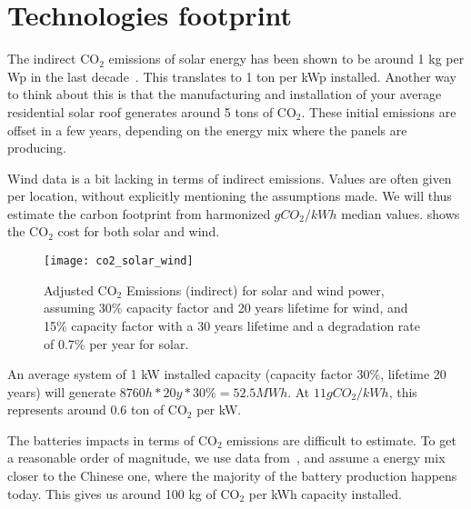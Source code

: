 \section{Technologies footprint}

The indirect $\mathrm{CO_2}$ emissions of solar energy has been shown to be around 1 kg per Wp in the last decade~. This translates to 1 ton per kWp installed. Another way to think about this is that the manufacturing and installation of your average residential solar roof generates around 5 tons of $\mathrm{CO_2}$. These initial emissions are offset in a few years, depending on the energy mix where the panels are producing.

Wind data is a bit lacking in terms of indirect emissions. Values are often given per location, without explicitly mentioning the assumptions made. We will thus estimate the carbon footprint from harmonized $gCO_2/kWh$ median values.  shows the $\mathrm{CO_2}$ cost for both solar and wind.


\begin{figure}[h]
	\texttt{[image: co2\_solar\_wind]}
	\caption[Adjusted $\mathrm{CO_2}$ Emissions (indirect) for solar and wind power, assuming 30\% capacity factor and 20 years lifetime for wind, and 15\% capacity factor with a 30 years lifetime and a degradation rate of 0.7\% per year for solar.]{Adjusted $\mathrm{CO_2}$ Emissions (indirect) for solar and wind power, assuming 30\% capacity factor and 20 years lifetime for wind, and 15\% capacity factor with a 30 years lifetime and a degradation rate of 0.7\% per year for solar.}
\end{figure}

An average system of 1 kW installed capacity (capacity factor 30\%, lifetime 20 years) will generate $8760h * 20y * 30\% = 52.5 MWh$. At $11 gCO_2/kWh$, this represents around 0.6 ton of $\mathrm{CO_2}$ per kW.

The batteries impacts in terms of $\mathrm{CO_2}$ emissions are difficult to estimate. To get a reasonable order of magnitude, we use data from~, and assume a energy mix closer to the Chinese one, where the majority of the battery production happens today. This gives us around 100 kg of $\mathrm{CO_2}$ per kWh capacity installed.

